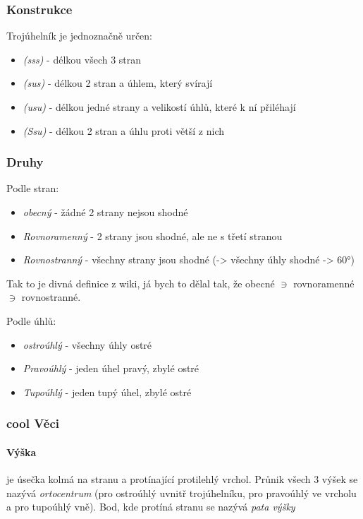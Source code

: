 \documentclass[12pt]{article}
\begin{document}
\subsubsection{Konstrukce}
\label{sec:troj-shodnost}
Trojúhelník je jednoznačně určen:
\begin{itemize}
\item \emph{(sss)} - délkou všech 3 stran
\item \emph{(sus)} - délkou 2 stran a úhlem, který svírají
\item \emph{(usu)} - délkou jedné strany a velikostí úhlů, které k ní přiléhají
\item \emph{(Ssu)} - délkou 2 stran a úhlu proti větší z nich
\end{itemize}
\subsubsection{Druhy}
Podle stran:
\begin{itemize}
\item \emph{obecný} - žádné 2 strany nejsou shodné
\item \emph{Rovnoramenný} - 2 strany jsou shodné, ale ne s třetí stranou
\item \emph{Rovnostranný} - všechny strany jsou shodné (->  všechny úhly shodné -> 60°)
\end{itemize}
\begin{scriptsize}
Tak to je divná definice z wiki, já bych to dělal tak, že obecné $\ni$ rovnoramenné $\ni$ rovnostranné.\\
\end{scriptsize}
Podle úhlů:
\begin{itemize}
\item \emph{ostroúhlý} - všechny úhly ostré
\item \emph{Pravoúhlý} - jeden úhel pravý, zbylé ostré
\item \emph{Tupoúhlý} - jeden tupý úhel, zbylé ostré
\end{itemize}
\subsubsection{cool Věci}
\paragraph{Výška} je úsečka kolmá na stranu a protínající protilehlý vrchol. Průnik všech 3 výšek se nazývá \emph{ortocentrum} (pro ostroúhlý uvnitř trojúhelníku, pro pravoúhlý ve vrcholu a pro tupoúhlý vně). Bod, kde protíná stranu se nazývá \emph{pata výšky}
\end{document}
